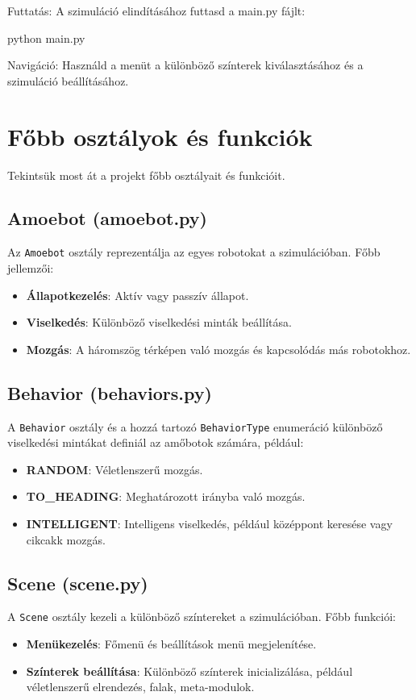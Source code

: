 \documentclass[	
  noindent
]{elteikthesis}[2024/04/26]
\begin{document}
      Futtatás: A szimuláció elindításához futtasd a main.py fájlt:
      
      python main.py
      
      Navigáció: Használd a menüt a különböző színterek kiválasztásához és a szimuláció beállításához.
  
  \section*{Főbb osztályok és funkciók}
    Tekintsük most át a projekt főbb osztályait és funkcióit.

    \subsection*{Amoebot (amoebot.py)}
    Az \texttt{Amoebot} osztály reprezentálja az egyes robotokat a szimulációban. Főbb jellemzői:
    \begin{itemize}[left=0pt]
        \item \textbf{Állapotkezelés}: Aktív vagy passzív állapot.
        \item \textbf{Viselkedés}: Különböző viselkedési minták beállítása.
        \item \textbf{Mozgás}: A háromszög térképen való mozgás és kapcsolódás más robotokhoz.
    \end{itemize}
  
    \subsection*{Behavior (behaviors.py)}
    A \texttt{Behavior} osztály és a hozzá tartozó \texttt{BehaviorType} enumeráció különböző viselkedési mintákat definiál az amőbotok számára, például:
    \begin{itemize}[left=0pt]
        \item \textbf{RANDOM}: Véletlenszerű mozgás.
        \item \textbf{TO\_HEADING}: Meghatározott irányba való mozgás.
        \item \textbf{INTELLIGENT}: Intelligens viselkedés, például középpont keresése vagy cikcakk mozgás.
    \end{itemize}
  
    \subsection*{Scene (scene.py)}
    A \texttt{Scene} osztály kezeli a különböző színtereket a szimulációban. Főbb funkciói:
    \begin{itemize}[left=0pt]
        \item \textbf{Menükezelés}: Főmenü és beállítások menü megjelenítése.
        \item \textbf{Színterek beállítása}: Különböző színterek inicializálása, például véletlenszerű elrendezés, falak, meta-modulok.
    \end{itemize}
  
\end{document}
